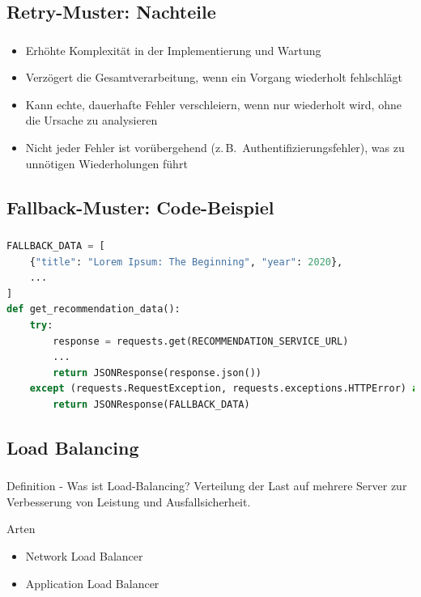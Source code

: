 \subsection{Retry-Muster: Nachteile}
\begin{frame}
    \frametitle{\insertsection}
    \framesubtitle{\insertsubsection}

    \begin{itemize}
        \item Erhöhte Komplexität in der Implementierung und Wartung
        \item Verzögert die Gesamtverarbeitung, wenn ein Vorgang wiederholt fehlschlägt
        \item Kann echte, dauerhafte Fehler verschleiern, wenn nur wiederholt wird, ohne die Ursache zu analysieren
        \item Nicht jeder Fehler ist vorübergehend (z.\,B.\ Authentifizierungsfehler), was zu unnötigen Wiederholungen führt
    \end{itemize}
\end{frame}

\subsection{\textbf{Fallback-Muster: Code-Beispiel}}

\begin{frame}[fragile]
    \frametitle{\insertsection}
    \framesubtitle{\insertsubsection}


    \begin{lstlisting}[language=Python]
FALLBACK_DATA = [
    {"title": "Lorem Ipsum: The Beginning", "year": 2020},
    ...
]
def get_recommendation_data():
    try:
        response = requests.get(RECOMMENDATION_SERVICE_URL)
        ...
        return JSONResponse(response.json())
    except (requests.RequestException, requests.exceptions.HTTPError) as e:
        return JSONResponse(FALLBACK_DATA)
    \end{lstlisting}
\end{frame}


\subsection{\textbf{Load Balancing}}
\begin{frame}
    \frametitle{\insertsection}
    \framesubtitle{\insertsubsection}
    \begin{block}{Definition - Was ist Load-Balancing?}
        Verteilung der Last auf mehrere Server zur Verbesserung von Leistung und Ausfallsicherheit.
    \end{block}
    \begin{block}{Arten}
        \begin{itemize}
       		\item Network Load Balancer
       		\item Application Load Balancer
         \end{itemize}
    \end{block}
\end{frame}


